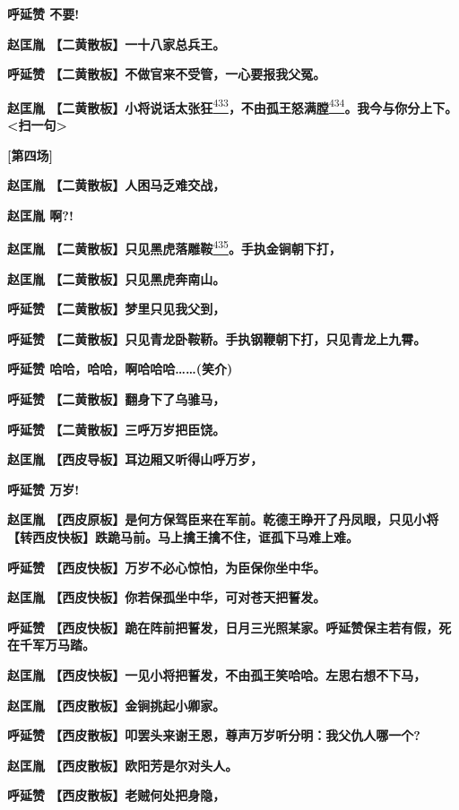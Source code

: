 \textbf{呼延赞 不要!}

\textbf{赵匡胤 【二黄散板】一十八家总兵王。}

\textbf{呼延赞 【二黄散板】不做官来不受管，一心要报我父冤。}

\textbf{赵匡胤
【二黄散板】小将说话太张狂}\protect\hyperlink{fn433}{\textsuperscript{433}}\textbf{，不由孤王怒满膛}\protect\hyperlink{fn434}{\textsuperscript{434}}\textbf{。我今与你分上下。\textless{}扫一句\textgreater{}}

\textbf{{[}第四场{]}}

\textbf{赵匡胤 【二黄散板】人困马乏难交战，}

\textbf{赵匡胤 啊?!}

\textbf{赵匡胤
【二黄散板】只见黑虎落雕鞍}\protect\hyperlink{fn435}{\textsuperscript{435}}\textbf{。手执金锏朝下打，}

\textbf{赵匡胤 【二黄散板】只见黑虎奔南山。}

\textbf{呼延赞 【二黄散板】梦里只见我父到，}

\textbf{呼延赞
【二黄散板】只见青龙卧鞍鞒。手执钢鞭朝下打，只见青龙上九霄。}

\textbf{呼延赞 哈哈，哈哈，啊哈哈哈\ldots{}\ldots{}(笑介)}

\textbf{呼延赞 【二黄散板】翻身下了乌骓马，}

\textbf{呼延赞 【二黄散板】三呼万岁把臣饶。}

\textbf{赵匡胤 【西皮导板】耳边厢又听得山呼万岁，}

\textbf{呼延赞 万岁!}

\textbf{赵匡胤
【西皮原板】是何方保驾臣来在军前。乾德王睁开了丹凤眼，只见小将【转西皮快板】跌跪马前。马上擒王擒不住，诓孤下马难上难。}

\textbf{呼延赞 【西皮快板】万岁不必心惊怕，为臣保你坐中华。}

\textbf{赵匡胤 【西皮快板】你若保孤坐中华，可对苍天把誓发。}

\textbf{呼延赞
【西皮快板】跪在阵前把誓发，日月三光照某家。呼延赞保主若有假，死在千军万马踏。}

\textbf{赵匡胤
【西皮快板】一见小将把誓发，不由孤王笑哈哈。左思右想不下马，}

\textbf{赵匡胤 【西皮散板】金锏挑起小卿家。}

\textbf{呼延赞
【西皮散板】叩罢头来谢王恩，尊声万岁听分明：我父仇人哪一个?}

\textbf{赵匡胤 【西皮散板】欧阳芳是尔对头人。}

\textbf{呼延赞 【西皮散板】老贼何处把身隐，}

